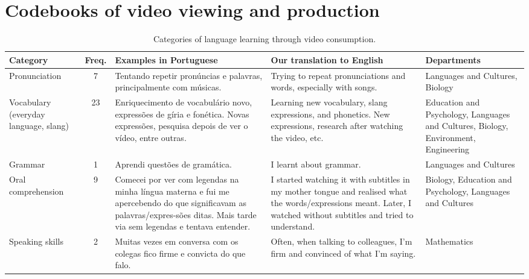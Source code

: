 \appendix
\section{Codebooks of video viewing and production}\label{annex-a}
\begin{table}[htpb]
\centering
\footnotesize
\begin{threeparttable}
\begin{tabular}{p{1.5cm} c p{3cm} p{3cm} p{3cm}}
\caption{Categories of language learning through video consumption.}
\label{tab-07}\\
\toprule
Category & Freq. & Examples in Portuguese & Our translation to English & Departments \\
\midrule
Pronunciation & 7 & Tentando repetir pronúncias e palavras, principalmente com músicas. & Trying to repeat pronunciations and words, especially with songs. & Languages and Cultures, Biology \\
Vocabulary (everyday language, slang) & 23 & Enriquecimento de vocabulário novo, expressões de gíria e fonética. Novas expressões, pesquisa depois de ver o vídeo, entre outras. & Learning new vocabulary, slang expressions, and phonetics. New expressions, research after watching the video, etc. & Education and Psychology, Languages and Cultures, Biology, Environment, Engineering \\

Grammar & 1 & Aprendi questões de gramática. & I learnt about grammar. & Languages and Cultures \\
Oral comprehension & 9 & Comecei por ver com legendas na minha língua materna e fui me apercebendo do que significavam as palavras/expres\newline -sões ditas. Mais tarde via sem legendas e tentava entender. & I started watching it with subtitles in my mother tongue and realised what the words/expressions meant. Later, I watched without subtitles and tried to understand. & Biology, Education and Psychology, Languages and Cultures \\
Speaking skills & 2 & Muitas vezes em conversa com os colegas fico firme e convicta do que falo. & Often, when talking to colleagues, I'm firm and convinced of what I'm saying. & Mathematics \\


\end{tabular}
\end{threeparttable}
\end{table}
